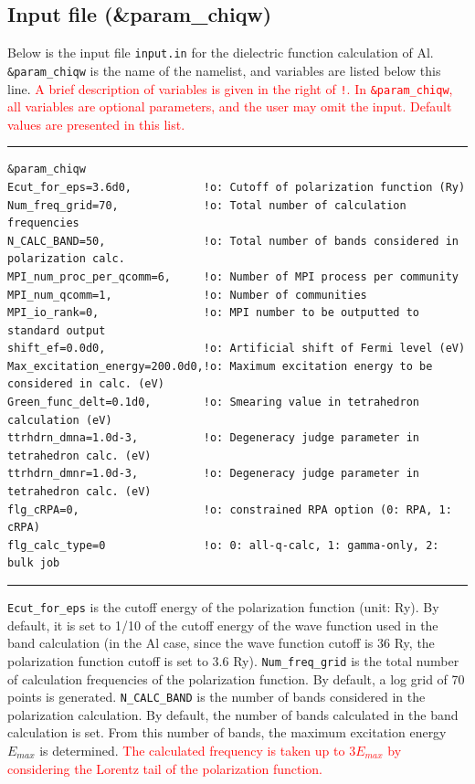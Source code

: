 \documentclass{article}
\newcommand{\tr}[1]{\textcolor{red}{#1}}
\begin{document}
\subsection{\label{input-chiqw}Input file (\&param\_chiqw)}
Below is the input file \verb+input.in+ for the dielectric function calculation of Al. \verb+&param_chiqw+ is the name of the namelist, and variables are listed below this line. \tr{A brief description of variables is given in the right of {\tt !}. In {\tt \&param\_chiqw}, all variables are optional parameters, and the user may omit the input. Default values are presented in this list.} 
\vspace{5mm}\hrule
\begin{verbatim}
&param_chiqw 
Ecut_for_eps=3.6d0,           !o: Cutoff of polarization function (Ry)
Num_freq_grid=70,             !o: Total number of calculation frequencies
N_CALC_BAND=50,               !o: Total number of bands considered in polarization calc.
MPI_num_proc_per_qcomm=6,     !o: Number of MPI process per community
MPI_num_qcomm=1,              !o: Number of communities
MPI_io_rank=0,                !o: MPI number to be outputted to standard output
shift_ef=0.0d0,               !o: Artificial shift of Fermi level (eV)
Max_excitation_energy=200.0d0,!o: Maximum excitation energy to be considered in calc. (eV)
Green_func_delt=0.1d0,        !o: Smearing value in tetrahedron calculation (eV)
ttrhdrn_dmna=1.0d-3,          !o: Degeneracy judge parameter in tetrahedron calc. (eV)
ttrhdrn_dmnr=1.0d-3,          !o: Degeneracy judge parameter in tetrahedron calc. (eV)
flg_cRPA=0,                   !o: constrained RPA option (0: RPA, 1: cRPA)
flg_calc_type=0               !o: 0: all-q-calc, 1: gamma-only, 2: bulk job
\end{verbatim}
\hrule\vspace{5mm}

\verb+Ecut_for_eps+ is the cutoff energy of the polarization function (unit: Ry). By default, it is set to 1/10 of the cutoff energy of the wave function used in the band calculation (in the Al case, since the wave function cutoff is 36 Ry, the polarization function cutoff is set to 3.6 Ry). \verb+Num_freq_grid+ is the total number of calculation frequencies of the polarization function. By default, a log grid of 70 points is generated. \verb+N_CALC_BAND+ is the number of bands considered in the polarization calculation. By default, the number of bands calculated in the band calculation is set. From this number of bands, the maximum excitation energy $E_{max}$ is determined. \tr{The calculated frequency is taken up to $3E_{max}$ by considering the Lorentz tail of the polarization function.}
\end{document}
